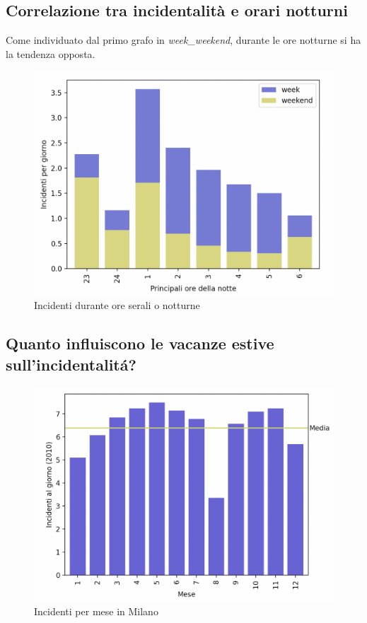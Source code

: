 \documentclass[a4paper]{report}
\begin{document}

\subsection{Correlazione tra incidentalità e orari notturni}

Come individuato dal primo grafo in \textit{week\_weekend}, durante le 
ore notturne si ha la tendenza opposta.

\begin{figure}
    \includegraphics[width=\linewidth]{../src/incidenti/incidenti_senza_coords/ore_punta/ore_notte.png}
    \caption{Incidenti durante ore serali o notturne}
    \label{fig:ore_notte}
\end{figure}


\subsection{Quanto influiscono le vacanze estive sull'incidentalit\'a?}

\begin{figure}
    \includegraphics[width=\linewidth]{../src/incidenti/incidenti_senza_coords/mese_incidenti/milano_mese.png}
    \caption{Incidenti per mese in Milano}
    \label{fig:milano_mese}
\end{figure}
\end{document}
